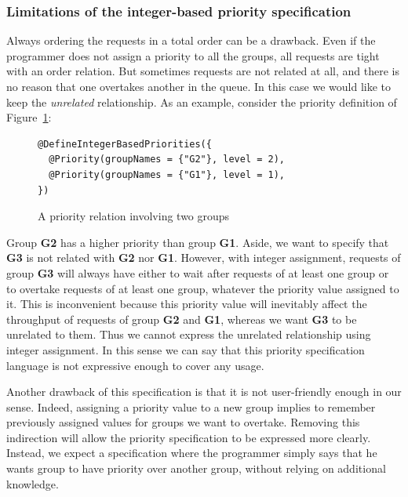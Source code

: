 \documentclass[11pt]{report}
\begin{document}
\subsubsection{Limitations of the integer-based priority specification}
Always ordering the requests in a total order can be a drawback. Even if the programmer does not assign a priority to all the groups, all requests are tight with an order relation. But sometimes requests are not related at all, and there is no reason that one overtakes another in the queue. In this case we would like to keep the \emph{unrelated} relationship. As an example, consider the priority definition of Figure~\ref{fig:two_priorities}:

\begin{figure}[!ht]
	\lstset{language=java, numbers=left, numberstyle=\tiny, stepnumber=1, numbersep=5pt, basicstyle=\footnotesize}
	\begin{lstlisting}[frame=single]
@DefineIntegerBasedPriorities({
  @Priority(groupNames = {"G2"}, level = 2),
  @Priority(groupNames = {"G1"}, level = 1),
})
 	\end{lstlisting}
\caption{A priority relation involving two groups}
\label{fig:two_priorities}
\end{figure}

Group \textbf{G2} has a higher priority than group \textbf{G1}. Aside, we want to specify that \textbf{G3} is not related with \textbf{G2} nor \textbf{G1}. However, with integer assignment, requests of group \textbf{G3} will always have either to wait after requests of at least one group or to overtake requests of at least one group, whatever the priority value assigned to it. This is inconvenient because this priority value will inevitably affect the throughput of requests of group \textbf{G2} and \textbf{G1}, whereas we want \textbf{G3} to be unrelated to them. Thus we cannot express the unrelated relationship using integer assignment.   
In this sense we can say that this priority specification language is not expressive enough to cover any usage. 

Another drawback of this specification is that it is not user-friendly enough in our sense. Indeed, assigning a priority value to a new group implies to remember previously assigned values for groups we want to overtake. Removing this indirection will allow the priority specification to be expressed more clearly. Instead, we expect a specification where the programmer simply says that he wants group to have priority over another group, without relying on additional knowledge.
\end{document}
